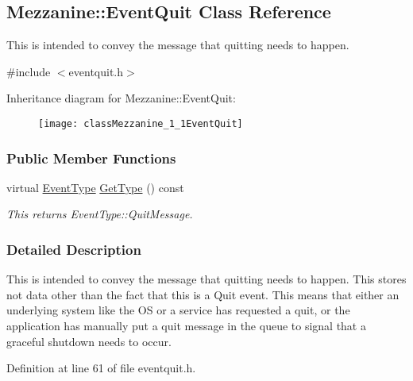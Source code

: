 \hypertarget{classMezzanine_1_1EventQuit}{
\subsection{Mezzanine::EventQuit Class Reference}
\label{classMezzanine_1_1EventQuit}
}


This is intended to convey the message that quitting needs to happen.  




{\ttfamily \#include $<$eventquit.h$>$}

Inheritance diagram for Mezzanine::EventQuit:\begin{figure}[H]
\begin{center}
\leavevmode
\texttt{[image: classMezzanine\_1\_1EventQuit]}
\end{center}
\end{figure}
\subsubsection*{Public Member Functions}
\begin{DoxyCompactItemize}
\item 
virtual \hyperlink{classMezzanine_1_1EventBase_ab85e31e97753b7e7ecb098f82526baef}{EventType} \hyperlink{classMezzanine_1_1EventQuit_adffd297e6d7ca09cfde8df0f08da5e31}{GetType} () const 
\begin{DoxyCompactList}\small\item\em This returns EventType::QuitMessage. \item\end{DoxyCompactList}\end{DoxyCompactItemize}


\subsubsection{Detailed Description}
This is intended to convey the message that quitting needs to happen. This stores not data other than the fact that this is a Quit event. This means that either an underlying system like the OS or a service has requested a quit, or the application has manually put a quit message in the queue to signal that a graceful shutdown needs to occur. 

Definition at line 61 of file eventquit.h.



